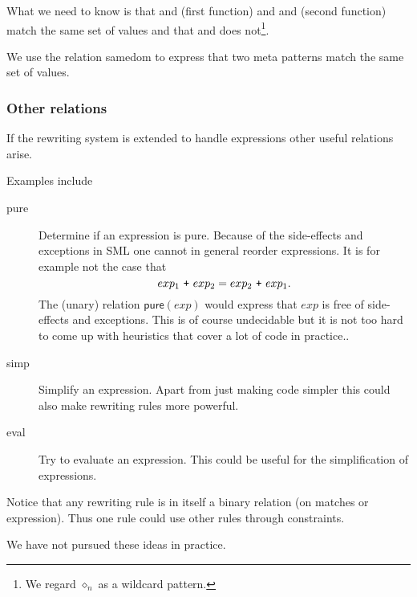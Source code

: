 What we need to know is that  and \ttt{_} (first
function) and \mbox{} and \mbox{}
(second function) match the same set of values and that
\mbox{} and \ttt{_} does not\footnote{We regard
  $\diamond_n$ as a wildcard pattern.}.

We use the relation \textsf{samedom} to express that two meta patterns match the
same set of values.

\subsubsection{Other relations}
If the rewriting system is extended to handle expressions other useful relations
arise.

Examples include
\begin{description}
\item[\textsf{pure}] Determine if an expression is pure. Because of the
  side-effects and exceptions in SML one cannot in general reorder
  expressions. It is for example not the case that
  \[
  exp_1\ \ttt{+}\ exp_2 = exp_2\ \ttt{+}\ exp_1.
  \]
  The (unary) relation $\textsf{pure}(exp)$ would express that $exp$ is free of
  side-effects and exceptions. This is of course undecidable but it is not too
  hard to come up with heuristics that cover a lot of code in practice..
\item[\textsf{simp}] Simplify an expression. Apart from just
  making code simpler this could also make rewriting rules more powerful.
\item[\textsf{eval}] Try to evaluate an expression. This could be
  useful for the simplification of expressions.
\end{description}

Notice that any rewriting rule is in itself a binary relation (on matches or
expression). Thus one rule could use other rules through constraints.

We have not pursued these ideas in practice.


